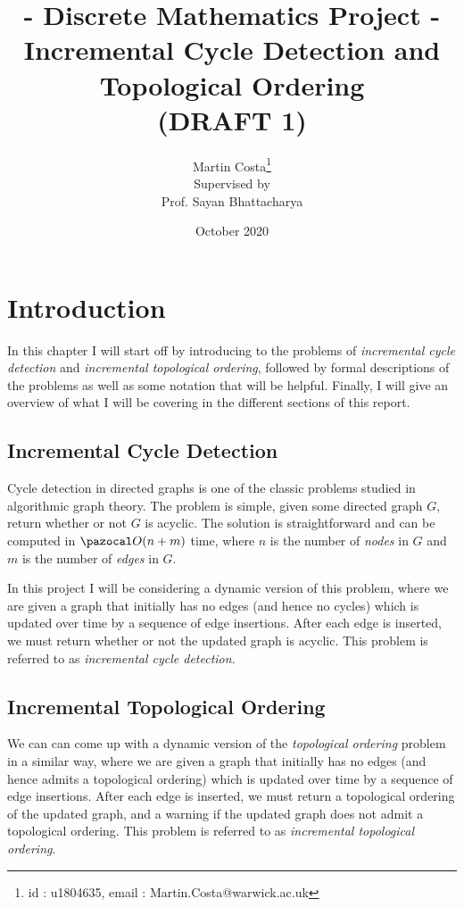 \documentclass{report}
\title{\large{- Discrete Mathematics Project -} \\ \LARGE{Incremental Cycle Detection and Topological Ordering} \\ (DRAFT 1)}
\author{\Large{Martin Costa}\footnote{id : u1804635, email : Martin.Costa@warwick.ac.uk} \\
[1.5cm]Supervised by \\
{Prof. Sayan Bhattacharya}}
\date{\vspace*{8cm}October 2020}
\begin{document}
\maketitle

\tableofcontents

\chapter{Introduction}\label{chapter1}

In this chapter I will start off by introducing to the problems of \textit{incremental cycle detection} and \textit{incremental topological ordering}, followed by formal descriptions of the problems as well as some notation that will be helpful. Finally, I will give an overview of what I will be covering in the different sections of this report.

\section{Incremental Cycle Detection}

Cycle detection in directed graphs is one of the classic problems studied in algorithmic graph theory. The problem is simple, given some directed graph $G$, return whether or not $G$ is acyclic. The solution is straightforward and can be computed in $\pazocal O(n+m)$ time, where $n$ is the number of \textit{nodes} in $G$ and $m$ is the number of \textit{edges} in $G$.

In this project I will be considering a dynamic version of this problem, where we are given a graph that initially has no edges (and hence no cycles) which is updated over time by a sequence of edge insertions. After each edge is inserted, we must return whether or not the updated graph is acyclic. This problem is referred to as \textit{incremental cycle detection}.

\section{Incremental Topological Ordering}

We can can come up with a dynamic version of the \textit{topological ordering} problem in a similar way, where we are given a graph that initially has no edges (and hence admits a topological ordering) which is updated over time by a sequence of edge insertions. After each edge is inserted, we must return a topological ordering of the updated graph, and a warning if the updated graph does not admit a topological ordering. This problem is referred to as \textit{incremental topological ordering}.
\end{document}
